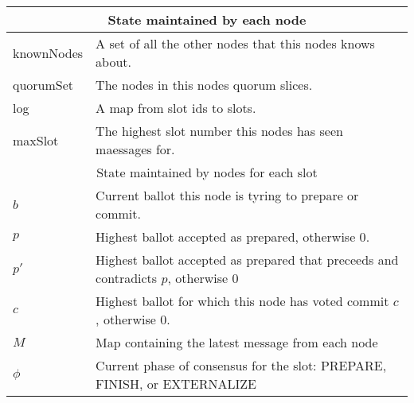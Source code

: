 \documentclass[preprint,11pt]{article} \usepackage{amsmath}
\begin{document}
\begin{table}
  \centering
  \begin{tabular}{|p{2cm}|p{10cm}|}
    \hline
    \multicolumn{2}{|c|}{State maintained by each node} \\
    \hline
    knownNodes & A set of all the other nodes that this nodes knows about. \\
    quorumSet & The nodes in this nodes quorum slices. \\
    log & A map from slot ids to slots. \\
    maxSlot & The highest slot number this nodes has seen maessages for. \\
    \hline
    \multicolumn{2}{|c|}{State maintained by nodes for each slot} \\
    \hline
    $b$ & Current ballot this node is tyring to prepare or commit. \\
    $p$ & Highest ballot accepted as prepared, otherwise $0$. \\
    $p'$ & Highest ballot accepted as prepared that preceeds and contradicts $p$, otherwise $ 0$ \\
    $c$ & Highest ballot for which this node has voted commit $c$, otherwise $0$. \\
    $M$ & Map containing the latest message from each node \\ 
    $\phi$ & Current phase of consensus for the slot: PREPARE, FINISH, or EXTERNALIZE \\
    \hline
  \end{tabular}
\end{table}


\begingroup
\raggedright

\endgroup
\end{document}

